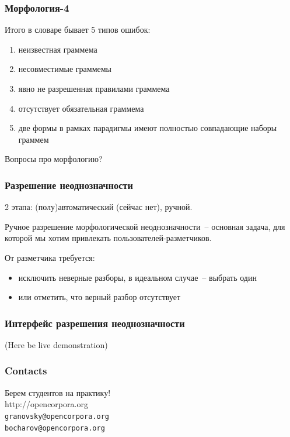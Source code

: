 \documentclass{beamer}
\begin{document}
\begin{frame}
\frametitle{Морфология-4}
Итого в словаре бывает 5 типов ошибок:
\begin{enumerate}
\item{неизвестная граммема}
\item{несовместимые граммемы}
\item{явно не разрешенная правилами граммема}
\item{отсутствует обязательная граммема}
\item{две формы в рамках парадигмы имеют полностью совпадающие наборы граммем}
\end{enumerate}
\end{frame}

\begin{frame}
Вопросы про морфологию?
\end{frame}

\begin{frame}
\frametitle{Разрешение неоднозначности}
2 этапа: (полу)автоматический (сейчас нет), ручной.
\pause

Ручное разрешение морфологической неоднозначности~-- основная задача, для которой мы хотим привлекать пользователей-разметчиков.
\pause

От разметчика требуется:
\begin{itemize}
\item{исключить неверные разборы, в идеальном случае~-- выбрать один}
\item{или отметить, что верный разбор отсутствует}
\end{itemize}
\end{frame}

\begin{frame}
\frametitle{Интерфейс разрешения неоднозначности}
(Here be live demonstration)
\end{frame}

\begin{frame}
\frametitle{Contacts}
\begin{center}
Берем студентов на практику!\\[\bigskipamount]
\LARGE http://opencorpora.org\\[\bigskipamount]
\Large\texttt{granovsky@opencorpora.org\\bocharov@opencorpora.org}
\end{center}
\end{frame}
\end{document}
